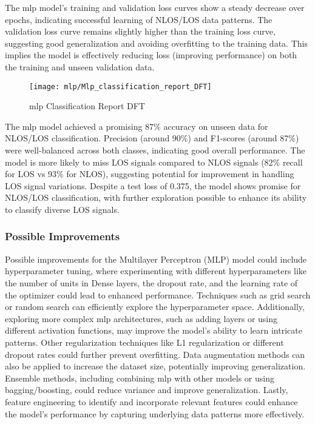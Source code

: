 The \acrshort{mlp} model's training and validation loss curves show a steady decrease over epochs, indicating successful learning of NLOS/LOS data patterns. The validation loss curve remains slightly higher than the training loss curve, suggesting good generalization and avoiding overfitting to the training data. This implies the model is effectively reducing loss (improving performance) on both the training and unseen validation data.

\begin{figure}[H] 
	\centering
	\texttt{[image: mlp/Mlp\_classification\_report\_DFT]}
	\caption{\acrshort{mlp} Classification Report DFT}\label{fig:Mlp_classification_report_DFT}
\end{figure}

The \acrshort{mlp} model achieved a promising 87\% accuracy on unseen data for NLOS/LOS classification. Precision (around 90\%) and F1-scores (around 87\%) were well-balanced across both classes, indicating good overall performance. The model is more likely to miss LOS signals compared to NLOS signals (82\% recall for LOS vs 93\% for NLOS), suggesting potential for improvement in handling LOS signal variations. Despite a test loss of 0.375, the model shows promise for NLOS/LOS classification, with further exploration possible to enhance its ability to classify diverse LOS signals.

\subsubsection{Possible Improvements}

Possible improvements for the Multilayer Perceptron (MLP) model could include hyperparameter tuning, where experimenting with different hyperparameters like the number of units in Dense layers, the dropout rate, and the learning rate of the optimizer could lead to enhanced performance. Techniques such as grid search or random search can efficiently explore the hyperparameter space. Additionally, exploring more complex \acrshort{mlp} architectures, such as adding layers or using different activation functions, may improve the model's ability to learn intricate patterns. Other regularization techniques like L1 regularization or different dropout rates could further prevent overfitting. Data augmentation methods can also be applied to increase the dataset size, potentially improving generalization. Ensemble methods, including combining \acrshort{mlp} with other models or using bagging/boosting, could reduce variance and improve generalization. Lastly, feature engineering to identify and incorporate relevant features could enhance the model's performance by capturing underlying data patterns more effectively.

